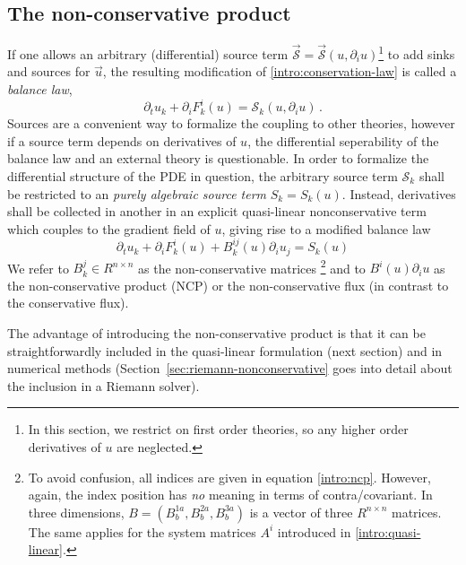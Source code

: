 \subsection{The non-conservative product}\label{sec:ncp}
If one allows an arbitrary (differential) source term $\vec{\mathcal S}=\vec{\mathcal{S}}(u, 
\partial_i u)$\footnote{
	In this section, we restrict on first order theories, so any higher order
	derivatives of $u$ are neglected.
} to add sinks and
sources for $\vec u$, the resulting modification of 
\eqref{intro:conservation-law} is called a \emph{balance law},
\begin{equation}\label{intro:balance-law}
\partial_t u_k + \partial_i F^i_k(u) = \mathcal S_k(u, \partial_i u) \,.
\end{equation}
Sources are a convenient way to formalize the coupling to other theories,
however if a source term depends on derivatives of $u$,
the differential seperability of the balance law and an external theory is
questionable. In order to formalize the differential structure of the
PDE in question, the arbitrary source term $\mathcal S_k$ shall be restricted
to an \emph{purely algebraic source term} $S_k=S_k(u)$. Instead, derivatives
shall be collected in another in an explicit quasi-linear nonconservative term which
couples to the gradient field of $u$, giving rise to a modified balance 
law
\begin{equation}\label{intro:ncp}
\partial_t u_k + \partial_i F^i_k(u) + B^{ij}_k(u) \partial_i u_j = S_k(u)
\end{equation}
We refer to $B^j_k \in R^{n\times n}$ as the non-conservative matrices%
\footnote{To avoid confusion, all indices are given in equation
\eqref{intro:ncp}. However, again, the index position has \emph{no} meaning
in terms of contra/covariant. In three dimensions, $B=(B^{1a}_b,B^{2a}_b,B^{3a}_b)$
is a vector of three $R^{n\times n}$ matrices. The same applies for
the system matrices $A^i$ introduced in \eqref{intro:quasi-linear}.
}
and to $B^i(u) \partial_i u$ as the non-conservative product (NCP) or the
non-conservative flux (in contrast to the conservative flux).

The advantage of introducing the non-conservative product is that it can be
straightforwardly included in the quasi-linear formulation (next section) and in numerical
methods (Section~\ref{sec:riemann-nonconservative} goes into detail about
the inclusion in a Riemann solver).

